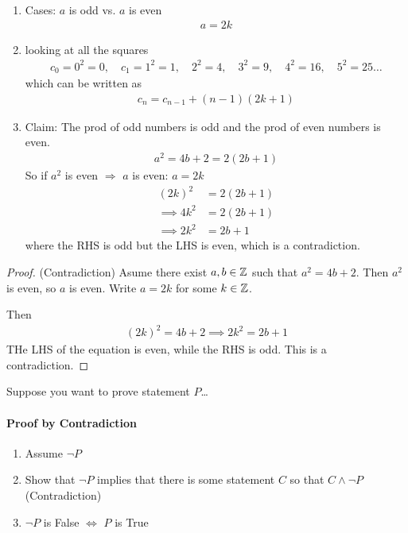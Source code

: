 \documentclass[../main.tex]{subfiles}
\begin{document}
\begin{enumerate}
    \item Cases: $a$ is odd vs. $a$ is even
    \begin{align*}
        a = 2k 
    \end{align*}
    \item looking at all the squares
    \begin{align*}
        c_0 = 0^2 = 0, \quad c_1 = 1^2 = 1, \quad 2^2 = 4, \quad 3^2 = 9, \quad 4^2 = 16, \quad 5^2 = 25 \dots
    \end{align*}
    which can be written as
    \begin{align*}
        c_n = c_{n - 1} + (n - 1)(2k + 1)
    \end{align*}
    \item Claim: The prod of odd numbers is odd and the prod of even numbers is even.
    \begin{align*}
        a^2 = 4b + 2 = 2(2b + 1)
    \end{align*}
    So if $a^2$ is even $\Rightarrow$ $a$ is even: $a = 2k$
    \begin{align*}
        (2k)^2 &= 2(2b + 1) \\
        \implies 4k^2 &= 2 (2b + 1) \\
        \implies 2k^2 &= 2b + 1 
    \end{align*}
    where the RHS is odd but the LHS is even, which is a contradiction.
\end{enumerate}
\begin{proof}
    (Contradiction) Asume there exist $a, b \in \mathbb{Z}$ such that $a^2 = 4b + 2$.
    Then $a^2$ is even, so $a$ is even. Write $a = 2k$ for some $k \in \mathbb{Z}$.

    Then
    \begin{align*}
        (2k)^2 = 4b + 2 \implies 2k^2 = 2b + 1
    \end{align*}
    THe LHS of the equation is even, while the RHS is odd. This is a contradiction.
\end{proof}

Suppose you want to prove statement $P$\dots

\paragraph{Proof by Contradiction}

\begin{enumerate}
    \item Assume $\neg P$
    \item Show that $\neg P$ implies that there is some statement $C$ so that
    $C \land \neg P$ (Contradiction)
    \item $\neg P$ is False $\Leftrightarrow$ $P$ is True
\end{enumerate}
\end{document}
